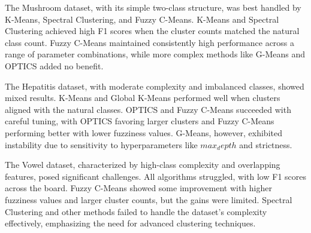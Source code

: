 The Mushroom dataset, with its simple two-class structure, was best handled by K-Means,
Spectral Clustering, and Fuzzy C-Means. K-Means and Spectral Clustering achieved high F1 
scores when the cluster counts matched the natural class count. Fuzzy C-Means maintained
consistently high performance across a range of parameter combinations, while more complex 
methods like G-Means and OPTICS added no benefit.

The Hepatitis dataset, with moderate complexity and imbalanced classes, showed mixed results.
K-Means and Global K-Means performed well when clusters aligned with the natural classes. 
OPTICS and Fuzzy C-Means succeeded with careful tuning, with OPTICS favoring larger clusters and Fuzzy C-Means performing better with lower fuzziness values.
G-Means, however, exhibited instability due to sensitivity to hyperparameters like $max_depth$ and strictness.

The Vowel dataset, characterized by high-class complexity and overlapping 
features, posed significant challenges. All algorithms struggled, with low F1 
scores across the board. Fuzzy C-Means showed some improvement with higher fuzziness 
values and larger cluster counts, but the gains were limited. Spectral Clustering 
and other methods failed to handle the dataset's complexity effectively, emphasizing the need for advanced clustering techniques.
